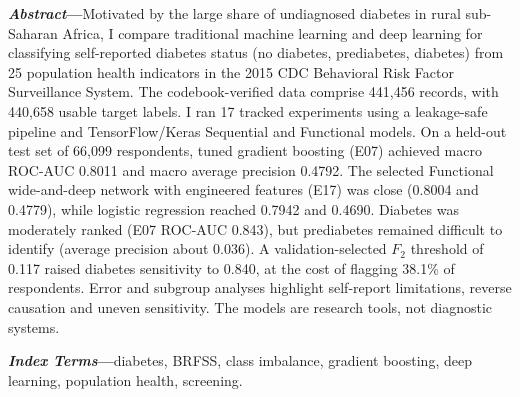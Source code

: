 \begin{center}
\begin{minipage}{0.88\textwidth}
\small\textbf{\textit{Abstract}---}Motivated by the large share of undiagnosed diabetes in rural sub-Saharan Africa, I compare traditional machine learning and deep learning for classifying self-reported diabetes status (no diabetes, prediabetes, diabetes) from 25 population health indicators in the 2015 CDC Behavioral Risk Factor Surveillance System. The codebook-verified data comprise 441,456 records, with 440,658 usable target labels. I ran 17 tracked experiments using a leakage-safe pipeline and TensorFlow/Keras Sequential and Functional models. On a held-out test set of 66,099 respondents, tuned gradient boosting (E07) achieved macro ROC-AUC 0.8011 and macro average precision 0.4792. The selected Functional wide-and-deep network with engineered features (E17) was close (0.8004 and 0.4779), while logistic regression reached 0.7942 and 0.4690. Diabetes was moderately ranked (E07 ROC-AUC 0.843), but prediabetes remained difficult to identify (average precision about 0.036). A validation-selected $F_2$ threshold of 0.117 raised diabetes sensitivity to 0.840, at the cost of flagging 38.1\% of respondents. Error and subgroup analyses highlight self-report limitations, reverse causation and uneven sensitivity. The models are research tools, not diagnostic systems.

\smallskip
\textbf{\textit{Index Terms}---}diabetes, BRFSS, class imbalance, gradient boosting, deep learning, population health, screening.
\end{minipage}
\end{center}
